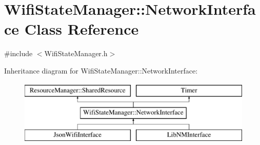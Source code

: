 \hypertarget{classWifiStateManager_1_1NetworkInterface}{}\section{Wifi\+State\+Manager\+:\+:Network\+Interface Class Reference}
\label{classWifiStateManager_1_1NetworkInterface}


{\ttfamily \#include $<$Wifi\+State\+Manager.\+h$>$}

Inheritance diagram for Wifi\+State\+Manager\+:\+:Network\+Interface\+:\begin{figure}[H]
\begin{center}
\leavevmode
\includegraphics[height=3.000000cm]{classWifiStateManager_1_1NetworkInterface}
\end{center}
\end{figure}
